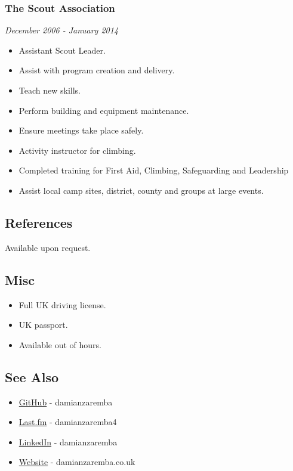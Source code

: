 \subsubsection{The Scout Association}\label{the-scout-association}

\emph{December 2006 - January 2014}

\begin{itemize}
\itemsep1pt\parskip0pt
\item
  Assistant Scout Leader.
\item
  Assist with program creation and delivery.
\item
  Teach new skills.
\item
  Perform building and equipment maintenance.
\item
  Ensure meetings take place safely.
\item
  Activity instructor for climbing.
\item
  Completed training for First Aid, Climbing, Safeguarding and
  Leadership
\item
  Assist local camp sites, district, county and groups at large events.
\end{itemize}

\subsection{References}\label{references}

Available upon request.

\subsection{Misc}\label{misc}

\begin{itemize}
\itemsep1pt\parskip0pt
\item
  Full UK driving license.
\item
  UK passport.
\item
  Available out of hours.
\end{itemize}

\subsection{See Also}\label{see-also}

\begin{itemize}
\itemsep1pt\parskip0pt
\item
  \href{https://github.com/damianzaremba}{GitHub} - damianzaremba
\item
  \href{http://last.fm/user/damianzaremba4}{Last.fm} - damianzaremba4
\item
  \href{http://uk.linkedin.com/in/damianzaremba}{LinkedIn} -
  damianzaremba
\item
  \href{http://damianzaremba.co.uk}{Website} - damianzaremba.co.uk
\end{itemize}
